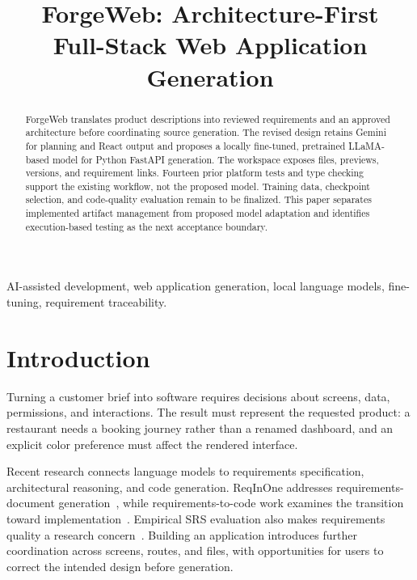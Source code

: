 \documentclass[conference,a4paper]{IEEEtran}
\begin{document}
\title{ForgeWeb: Architecture-First\\Full-Stack Web Application Generation}
\author{
}
\maketitle

\begin{abstract}
ForgeWeb translates product descriptions into reviewed requirements and an approved architecture before coordinating source generation. The revised design retains Gemini for planning and React output and proposes a locally fine-tuned, pretrained LLaMA-based model for Python FastAPI generation. The workspace exposes files, previews, versions, and requirement links. Fourteen prior platform tests and type checking support the existing workflow, not the proposed model. Training data, checkpoint selection, and code-quality evaluation remain to be finalized. This paper separates implemented artifact management from proposed model adaptation and identifies execution-based testing as the next acceptance boundary.
\end{abstract}
\begin{IEEEkeywords}
AI-assisted development, web application generation, local language models, fine-tuning, requirement traceability.
\end{IEEEkeywords}

\section{Introduction}
Turning a customer brief into software requires decisions about screens, data, permissions, and interactions. The result must represent the requested product: a restaurant needs a booking journey rather than a renamed dashboard, and an explicit color preference must affect the rendered interface.

Recent research connects language models to requirements specification, architectural reasoning, and code generation. ReqInOne addresses requirements-document generation~\cite{ieee1}, while requirements-to-code work examines the transition toward implementation~\cite{ieee2}. Empirical SRS evaluation also makes requirements quality a research concern~\cite{ieee3}. Building an application introduces further coordination across screens, routes, and files, with opportunities for users to correct the intended design before generation.
\end{document}
